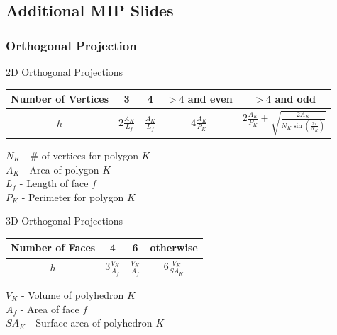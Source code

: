 \documentclass[compress,10pt]{beamer}
\begin{document}
\subsection{Additional MIP Slides}
\begin{frame}[t]
\frametitle{Orthogonal Projection}
\begin{block}{2D Orthogonal Projections}
\begin{table}
\centering
\begin{tabular}{|c|c|c|c|c|}
	\hline
	Number of Vertices & 3 & 4 & $>4$ and even& $>4$ and odd \\
	\hline
	$h$ & $2 \frac{A_K}{L_f}$ & $\frac{A_K}{L_f}$ & $4 \frac{A_K}{P_K}$ & $2 \frac{A_K}{P_K} + \sqrt{\frac{2 A_K}{N_K \sin(\frac{2 \pi}{N_K})}}$ \\
	\hline
\end{tabular}
\end{table}
\vspace{3mm}
$N_K$ - \# of vertices for polygon $K$\\
$A_K$ - Area of polygon $K$\\
$L_f$  - Length of face $f$\\
$P_K$ - Perimeter for polygon $K$
\end{block}
\begin{block}{3D Orthogonal Projections}
\begin{table}
\centering
\begin{tabular}{|c|c|c|c|}
	\hline
	Number of Faces & 4 & 6 & otherwise \\
	\hline
	$h$ & $3 \frac{V_K}{A_f}$ & $\frac{V_K}{A_f}$ & $6 \frac{V_K}{SA_K}$  \\ [1ex]
	\hline
\end{tabular}
\end{table}
\vspace{3mm}
$V_K$  - Volume of polyhedron $K$\\
$A_f$   - Area of face $f$\\
$SA_K$ - Surface area of polyhedron $K$
\end{block}
\end{frame}
\end{document}
